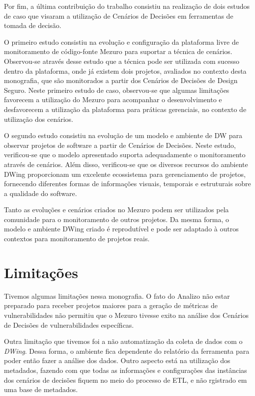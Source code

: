 %

Por fim, a última contribuição do trabalho consistiu na realização de dois estudos de caso que visaram a utilização de Cenários de Decisões em ferramentas de tomada de decisão. 

O primeiro estudo consistiu na evolução e configuração da plataforma livre de monitoramento de código-fonte Mezuro para suportar a técnica de cenários. Observou-se através desse estudo que a técnica pode ser utilizada com sucesso dentro da plataforma, onde já existem dois projetos, avaliados no contexto desta monografia, que são monitorados a partir dos Cenários de Decisões de Design Seguro. Neste primeiro estudo de caso, observou-se que algumas limitações favorecem a utilização do Mezuro para acompanhar o desenvolvimento e desfavorecem a utilização da plataforma para práticas gerenciais, no contexto de utilização dos cenários.

O segundo estudo consistiu na evolução de um modelo e ambiente de DW para observar projetos de software a partir de Cenários de Decisões. Neste estudo, verificou-se que o modelo apresentado suporta adequadamente o monitoramento através de cenários. Além disso, verificou-se que os diversos recursos do ambiente DWing proporcionam um excelente ecossistema para gerenciamento de projetos, fornecendo diferentes formas de informações visuais, temporais e estruturais sobre a qualidade do software. 

Tanto as evoluções e cenários criados no Mezuro podem ser utilizados pela comunidade para o monitoramento de outros projetos. Da mesma forma, o modelo e ambiente DWing criado é reprodutível e pode ser adaptado à outros contextos para monitoramento de projetos reais.



\section{Limitações}

Tivemos algumas limitações nessa monografia.
O fato do Analizo não estar preparado para receber projetos maiores para a geração de métricas de vulnerabilidades não permitiu que o Mezuro tivesse exito na análise dos Cenários de Decisões de vulnerabilidades específicas.


Outra limitação que tivemos foi a não automatização da coleta de dados com o \emph{DWing}. Dessa forma, o ambiente fica dependente do relatório da ferramenta para poder então fazer a análise dos dados. Outro aspecto está na utilização dos metadados, fazendo com que todas as informações e configurações das instâncias dos cenários de decisões fiquem no meio do processo de ETL, e não rgistrado em uma base de metadados.


